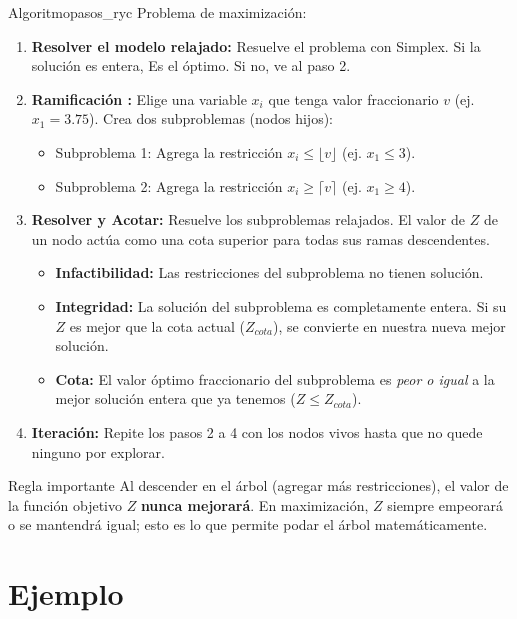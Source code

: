 \documentclass[10pt,a4paper]{article}
\begin{document}
\begin{mytheo}{Algoritmo}{pasos_ryc}
Problema de maximización:
\begin{enumerate}
    \item \textbf{Resolver el modelo relajado:} Resuelve el problema con Simplex. Si la solución es entera, Es el óptimo. Si no, ve al paso 2.
    \item \textbf{Ramificación :} Elige una variable $x_i$ que tenga valor fraccionario $v$ (ej. $x_1 = 3.75$). Crea dos subproblemas (nodos hijos):
    \begin{itemize}
        \item Subproblema 1: Agrega la restricción $x_i \le \lfloor v \rfloor$ (ej. $x_1 \le 3$).
        \item Subproblema 2: Agrega la restricción $x_i \ge \lceil v \rceil$ (ej. $x_1 \ge 4$).
    \end{itemize}
    \item \textbf{Resolver y Acotar:} Resuelve los subproblemas relajados. El valor de $Z$ de un nodo actúa como una cota superior para todas sus ramas descendentes. 
    \begin{itemize}
        \item \textbf{Infactibilidad:} Las restricciones del subproblema no tienen solución.
        \item \textbf{Integridad:} La solución del subproblema es completamente entera. Si su $Z$ es mejor que la cota actual ($Z_{cota}$), se convierte en nuestra nueva mejor solución.
        \item \textbf{Cota:} El valor óptimo fraccionario del subproblema es \textit{peor o igual} a la mejor solución entera que ya tenemos ($Z \le Z_{cota}$).
    \end{itemize}
    \item \textbf{Iteración:} Repite los pasos 2 a 4 con los nodos vivos hasta que no quede ninguno por explorar.
\end{enumerate}
\end{mytheo}

\begin{alerta}{Regla importante}
Al descender en el árbol (agregar más restricciones), el valor de la función objetivo $Z$ \textbf{nunca mejorará}. En maximización, $Z$ siempre empeorará o se mantendrá igual; esto es lo que permite podar el árbol matemáticamente.
\end{alerta}

\section{Ejemplo }
\end{document}
